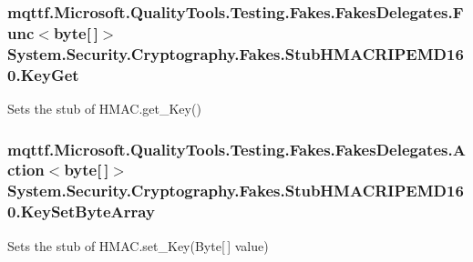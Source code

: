\hypertarget{class_system_1_1_security_1_1_cryptography_1_1_fakes_1_1_stub_h_m_a_c_r_i_p_e_m_d160_ac2551165bf54d4a3cc7a7135469a0f68}{
\subsubsection[{Key\-Get}]{\setlength{\rightskip}{0pt plus 5cm}mqttf.\-Microsoft.\-Quality\-Tools.\-Testing.\-Fakes.\-Fakes\-Delegates.\-Func$<$byte\mbox{[}$\,$\mbox{]}$>$ System.\-Security.\-Cryptography.\-Fakes.\-Stub\-H\-M\-A\-C\-R\-I\-P\-E\-M\-D160.\-Key\-Get}}\label{class_system_1_1_security_1_1_cryptography_1_1_fakes_1_1_stub_h_m_a_c_r_i_p_e_m_d160_ac2551165bf54d4a3cc7a7135469a0f68}


Sets the stub of H\-M\-A\-C.\-get\-\_\-\-Key()

\hypertarget{class_system_1_1_security_1_1_cryptography_1_1_fakes_1_1_stub_h_m_a_c_r_i_p_e_m_d160_a87d598e49a6ca8b2511eb0ddbba90436}{
\subsubsection[{Key\-Set\-Byte\-Array}]{\setlength{\rightskip}{0pt plus 5cm}mqttf.\-Microsoft.\-Quality\-Tools.\-Testing.\-Fakes.\-Fakes\-Delegates.\-Action$<$byte\mbox{[}$\,$\mbox{]}$>$ System.\-Security.\-Cryptography.\-Fakes.\-Stub\-H\-M\-A\-C\-R\-I\-P\-E\-M\-D160.\-Key\-Set\-Byte\-Array}}\label{class_system_1_1_security_1_1_cryptography_1_1_fakes_1_1_stub_h_m_a_c_r_i_p_e_m_d160_a87d598e49a6ca8b2511eb0ddbba90436}


Sets the stub of H\-M\-A\-C.\-set\-\_\-\-Key(\-Byte\mbox{[}$\,$\mbox{]} value)

